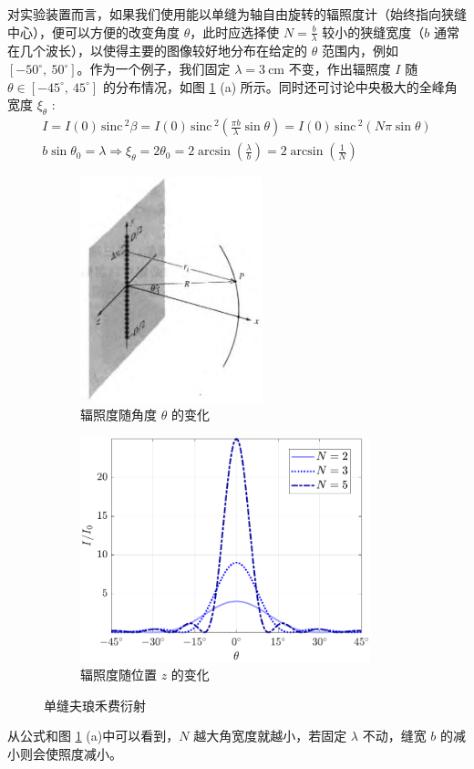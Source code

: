 \documentclass[UTF8]{article}
\def\sinc{\mathrm{\,sinc}\,}
\theoremstyle{MyLineTheoremStyle} %
\theoremstyle{MyBlockTheoremStyle} %
\theoremstyle{MySubsubsectionStyle} %
\begin{document}
对实验装置而言，如果我们使用能以单缝为轴自由旋转的辐照度计（始终指向狭缝中心），便可以方便的改变角度 $\theta$，此时应选择使 $N = \frac{b}{\lambda}$ 较小的狭缝宽度（$b$ 通常在几个波长），以使得主要的图像较好地分布在给定的 $\theta$ 范围内，例如 $[-50^\circ,\ 50^\circ]$。作为一个例子，我们固定 $\lambda = 3 \ \mathrm{cm}$ 不变，作出辐照度 $I$ 随 $\theta \in [-45^\circ,\ 45^\circ]$ 的分布情况，如图 \ref{单缝夫琅禾费衍射} (a) 所示。同时还可讨论中央极大的全峰角宽度 $\xi_{\theta}$ : 
\begin{gather}
I = I(0) \sinc^2 \beta =  I(0) \sinc^2\left( \frac{\pi b}{\lambda} \sin \theta \right) = I(0) \sinc^2\left( N \pi \sin \theta \right) \\ 
b \sin \theta_0 = \lambda \Longrightarrow \xi_{\theta} = 2 \theta_0 = 2 \arcsin \left(\frac{\lambda}{b}\right) = 2 \arcsin \left(\frac{1}{N}\right)
\end{gather}
\begin{figure}[H]\centering
\begin{subfigure}[b]{0.5\columnwidth}\centering
    \includegraphics[height=185pt]{assets/0/4.2 理想相干线光源.jpg}
    \caption{辐照度随角度 $\theta$ 的变化}
\end{subfigure}\hfill
\begin{subfigure}[b]{0.5\columnwidth}\centering
    \includegraphics[height=185pt]{assets/0/4.3 辐照度随角度变化.pdf}
    \caption{辐照度随位置 $z$ 的变化}
\end{subfigure}
\caption{单缝夫琅禾费衍射}
\label{单缝夫琅禾费衍射}
\end{figure}
从公式和图 \ref{单缝夫琅禾费衍射} (a)中可以看到，$N$ 越大角宽度就越小，若固定 $\lambda$ 不动，缝宽 $b$ 的减小则会使照度减小。
\end{document}

